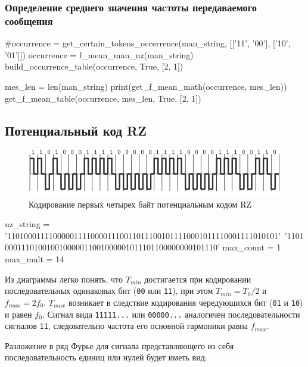 \documentclass[12pt, a4paper]{article}
\begin{document}
\subsubsection*{Определение среднего значения чаcтоты передаваемого сообщения}

\begin{pycode}
#occurrence = get_certain_tokens_occerrence(man_string, [['11', '00'], ['10', '01']])
occurrence = f_mean_man_nz(man_string)
build_occurrence_table(occurrence, True, [2, 1])

mes_len = len(man_string)
print(get_f_mean_math(occurrence, mes_len))
get_f_mean_table(occurrence, mes_len, True, [2, 1])
\end{pycode}

\newpage

\subsection{Потенциальный код RZ}

\begin{figure}[h]
  \begin{center}
    \includegraphics{rz}
    \caption{Кодирование первых четырех байт потенциальным кодом RZ}
  \end{center}
\end{figure}

\begin{pycode}
nz_string = '11010001111000001111000011100110111001011110001011110001111010101'\
  '1101000111010010010000011001000001011101100000000101110'
max_count = 1
max_mult = 14
\end{pycode}

Из диаграммы легко понять, что $T_{min}$ достигается при кодировании последовательных
одинаковых бит (\texttt{00} или \texttt{11}), при этом $T_{min} = T_0 / 2$ 
и $f_{max} = 2 f_0$. $T_{max}$ возникает в следствие кодирования чередующихся
бит (\texttt{01} и \texttt{10}) и равен $f_0$. Сигнал вида \texttt{11111...} или
\texttt{00000...} аналогичен последовательности сигналов \texttt{11}, следовательно
частота его основной гармоники равна $f_{max}$.

Разложение в ряд Фурье для сигнала представляющего из себя последовательность
единиц или нулей будет иметь вид:
\end{document}
